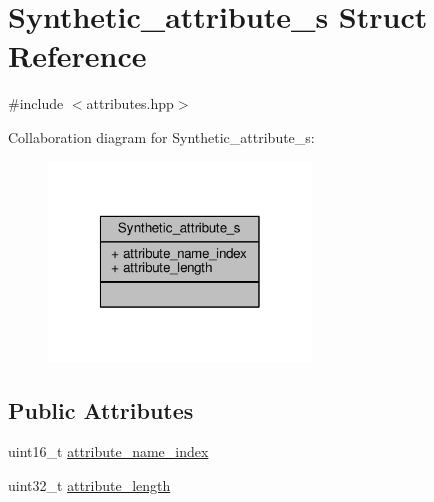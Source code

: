 \hypertarget{structSynthetic__attribute__s}{\section{Synthetic\+\_\+attribute\+\_\+s Struct Reference}
\label{structSynthetic__attribute__s}
}


{\ttfamily \#include $<$attributes.\+hpp$>$}



Collaboration diagram for Synthetic\+\_\+attribute\+\_\+s\+:\nopagebreak
\begin{figure}[H]
\begin{center}
\leavevmode
\includegraphics[width=198pt]{structSynthetic__attribute__s__coll__graph}
\end{center}
\end{figure}
\subsection*{Public Attributes}
\begin{DoxyCompactItemize}
\item 
uint16\+\_\+t \hyperlink{structSynthetic__attribute__s_a40701978ef09290bcaa9793503312706}{attribute\+\_\+name\+\_\+index}
\item 
uint32\+\_\+t \hyperlink{structSynthetic__attribute__s_a3c8e6a2024b6646ced85a7414040b6f6}{attribute\+\_\+length}
\end{DoxyCompactItemize}


